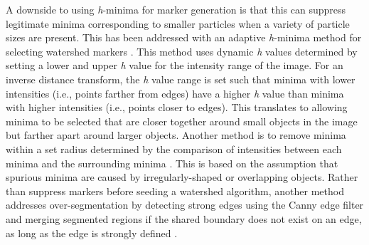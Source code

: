 A downside to using \textit{h}-minima for marker generation is that this can
suppress legitimate minima corresponding to smaller particles when a variety
of particle sizes are present. This has been addressed with an adaptive
\textit{h}-minima method for selecting watershed markers \cite{Burgmann2022}.
This method uses dynamic \textit{h} values determined by setting a lower and
upper \textit{h} value for the intensity range of the image. For an inverse
distance transform, the \textit{h}
value range is set such that minima with lower intensities (i.e., points
farther from edges) have a higher \textit{h} value than minima with higher
intensities (i.e., points closer to edges). This translates to allowing
minima to be selected that are closer together around small objects in the
image but farther apart around larger objects. Another method is to remove
minima within a set radius determined by the comparison of intensities
between each minima and the surrounding minima \cite{Sun2017}.
This is based on the
assumption that spurious minima are caused by irregularly-shaped or
overlapping objects. Rather than suppress markers before seeding a
watershed algorithm, another method addresses over-segmentation by
detecting strong edges using the Canny edge filter and merging segmented
regions if the shared boundary does not exist on an edge, as long as the
edge is strongly defined \cite{Canny1986,Kim2003}.

